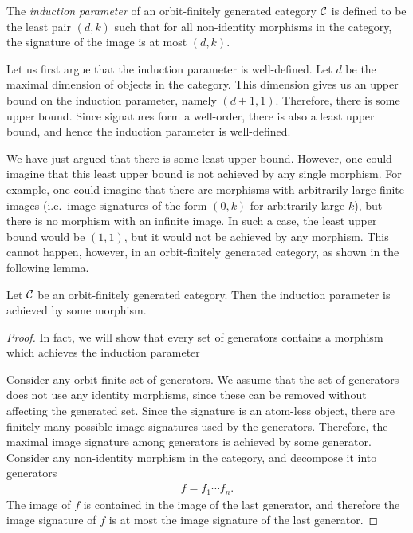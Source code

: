 \begin{definition}
    The \emph{induction parameter} of an orbit-finitely generated category ${\mathcal C}$ is defined to be the least pair $(d,k)$ such that for all non-identity morphisms in the category, the signature of the image is at most $(d,k)$.
\end{definition}

Let us first argue that the induction parameter is well-defined. Let $d$ be the maximal dimension of objects in the category. This dimension gives us an upper bound on the induction parameter, namely $(d+1,1)$. Therefore, there is some upper bound. 
Since signatures form a well-order, there is also a  least upper bound, and hence the induction parameter is well-defined.  

We have just argued that there is some least upper bound. However, one could imagine that this least upper bound is not achieved by any single morphism. For example, one could imagine that there are morphisms with arbitrarily large finite images (i.e.~image signatures of the form $(0,k)$ for arbitrarily large $k$),  but there is no morphism with an infinite image. In such a case, the least upper bound would be $(1,1)$, but it would not be achieved by any morphism. This cannot happen, however, in an orbit-finitely generated category, as shown in the following lemma. 

\begin{lemma}\label{lem:maximal-image-signature}
    Let ${\mathcal C}$ be an orbit-finitely generated category. Then the induction parameter is achieved by some morphism.
\end{lemma}
\begin{proof} In fact, we will show that every set of generators contains a morphism which achieves the induction parameter
    
    
Consider any orbit-finite set of generators. We assume that the set of generators does not use any identity morphisms, since these can be removed without affecting the generated set.  
Since the signature is an atom-less object, there are finitely many possible image signatures used by the generators. Therefore, the maximal image  signature among generators is achieved by some generator.     Consider  any non-identity morphism in the category, and decompose it into generators  
    \begin{align*}
     f = f_1  \cdots f_n. 
    \end{align*}
The image of $f$ is contained in the image of the last generator, and therefore the image signature of $f$ is at most the image signature of the last generator. 
\end{proof}


